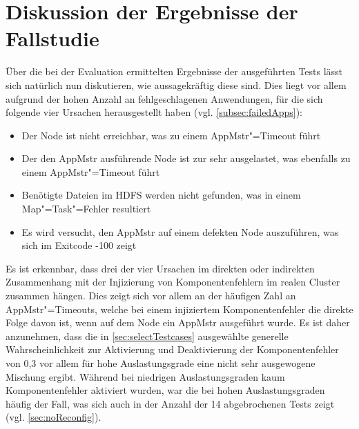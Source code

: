 \section{Diskussion der Ergebnisse der Fallstudie}
\label{sec:discussionResults}

Über die bei der Evaluation ermittelten Ergebnisse der ausgeführten Tests lässt sich natürlich nun diskutieren, wie aussagekräftig diese sind.
Dies liegt vor allem aufgrund der hohen Anzahl an fehlgeschlagenen Anwendungen, für die sich folgende vier Ursachen herausgestellt haben (vgl. \cref{subsec:failedApps}):

\begin{itemize}
    \item Der Node ist nicht erreichbar, was zu einem \gls{AppMstr}"=Timeout führt
    \item Der den \gls{AppMstr} ausführende Node ist zur sehr ausgelastet, was ebenfalls zu einem \gls{AppMstr}"=Timeout führt
    \item Benötigte Dateien im \gls{HDFS} werden nicht gefunden, was in einem Map"=Task"=Fehler resultiert
    \item Es wird versucht, den \gls{AppMstr} auf einem defekten Node auszuführen, was sich im Exitcode -100 zeigt
\end{itemize}

Es ist erkennbar, dass drei der vier Ursachen im direkten oder indirekten Zusammenhang mit der Injizierung von Komponentenfehlern im realen Cluster zusammen hängen.
Dies zeigt sich vor allem an der häufigen Zahl an \gls{AppMstr}"=Timeouts, welche bei einem injiziertem Komponentenfehler die direkte Folge davon ist, wenn auf dem Node ein \gls{AppMstr} ausgeführt wurde.
Es ist daher anzunehmen, dass die in \cref{sec:selectTestcases} ausgewählte generelle Wahrscheinlichkeit zur Aktivierung und Deaktivierung der Komponentenfehler von 0,3 vor allem für hohe Auslastungsgrade eine nicht sehr ausgewogene Mischung ergibt.
Während bei niedrigen Auslastungsgraden kaum Komponentenfehler aktiviert wurden, war die bei hohen Auslastungsgraden häufig der Fall, was sich auch in der Anzahl der 14 abgebrochenen Tests zeigt (vgl. \cref{sec:noReconfig}).


